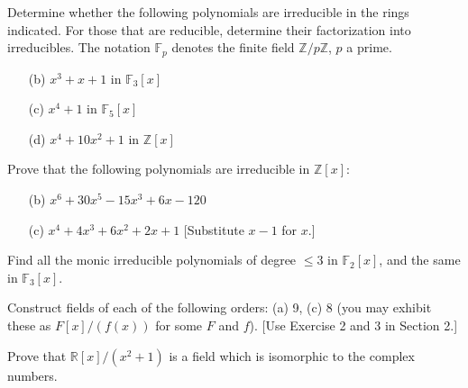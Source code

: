 \documentclass[12pt,letterpaper]{hmcpset}
\newcommand{\Ff}{\mathbb{F}}
\newcommand{\Zz}{\mathbb{Z}}
\newcommand{\Rr}{\mathbb{R}}
\begin{document}

\begin{problem}[9.4.1bcd]
	Determine whether the following polynomials are irreducible in the rings indicated. For those that are reducible, determine their factorization into irreducibles. The notation $\Ff_p$ denotes the finite field $\Zz/p\Zz$, $p$ a prime.
	\begin{enumerate}
		\item[(b)] $x^3 + x + 1$ in $\Ff_3[x]$
		\item[(c)] $x^4 + 1$ in $\Ff_5[x]$
		\item[(d)] $x^4 + 10x^2 + 1$ in $\Zz[x]$
	\end{enumerate}
\end{problem}

\begin{solution}
\vfill
\end{solution}
\newpage

\begin{problem}[9.4.2bc]
	Prove that the following polynomials are irreducible in $\Zz[x]$:
	\begin{enumerate}
		\item [(b)] $x^6 + 30x^5 -15x^3 + 6x - 120$
		\item [(c)] $x^4 + 4x^3 + 6x^2 + 2x+ 1$ [Substitute $x-1$ for $x$.]
	\end{enumerate}
\end{problem}

\begin{solution}
\vfill
\end{solution}
\newpage

\begin{problem}
	Find all the monic irreducible polynomials of degree $\le 3$ in $\Ff_2[x]$,  and the same in $\Ff_3[x].$
\end{problem}

\begin{problem}[9.4.6ac]
	Construct fields of each of the following orders: (a) 9, (c) 8 (you may exhibit these as $F[x]/(f(x))$ for some $F$ and $f$). [Use Exercise 2 and 3 in Section 2.]
\end{problem}
\begin{solution}
\vfill
\end{solution}
\newpage

\begin{problem}[9.4.7]
	Prove that $\Rr[x]/(x^2+1)$ is a field which is isomorphic to the complex numbers.
\end{problem}
\begin{solution}
	\vfill
\end{solution}
\newpage
\end{document}
